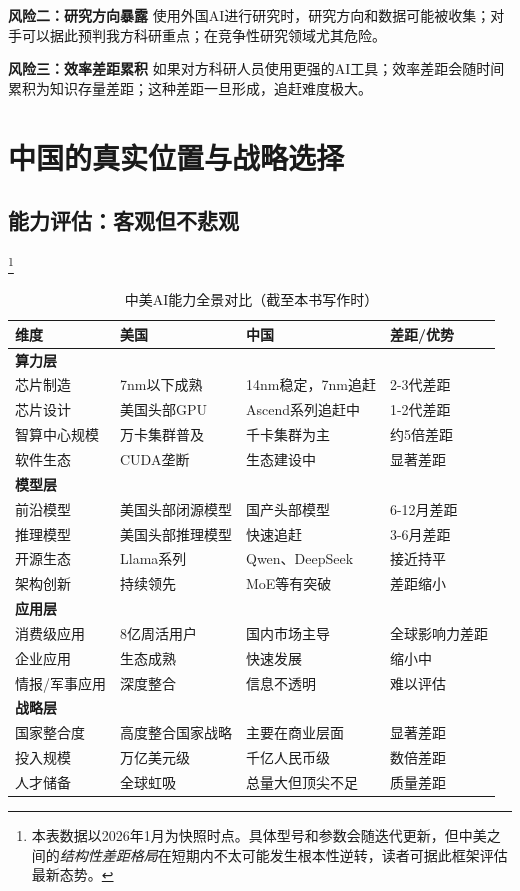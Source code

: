\textbf{风险二：研究方向暴露}
使用外国AI进行研究时，研究方向和数据可能被收集；对手可以据此预判我方科研重点；在竞争性研究领域尤其危险。

\textbf{风险三：效率差距累积}
如果对方科研人员使用更强的AI工具；效率差距会随时间累积为知识存量差距；这种差距一旦形成，追赶难度极大。

\section{中国的真实位置与战略选择}

\subsection{能力评估：客观但不悲观}

\begin{table}[H]
\centering
\caption{中美AI能力全景对比（截至本书写作时）\label{tab:us_china_ai_snapshot}}\footnote{本表数据以2026年1月为快照时点。具体型号和参数会随迭代更新，但中美之间的\emph{结构性差距格局}在短期内不太可能发生根本性逆转，读者可据此框架评估最新态势。}
\small
\begin{tabular}{p{3cm}p{3.5cm}p{3.5cm}p{2.5cm}}
\toprule
{\bfseries 维度} & \textbf{美国} & \textbf{中国} & \textbf{差距/优势} \\
\midrule
\multicolumn{4}{l}{\textbf{算力层}} \\
\midrule
芯片制造 & 7nm以下成熟 & 14nm稳定，7nm追赶 & 2-3代差距 \\
芯片设计 & 美国头部GPU\footnotemark & Ascend系列追赶中 & 1-2代差距 \\
智算中心规模 & 万卡集群普及 & 千卡集群为主 & 约5倍差距 \\
软件生态 & CUDA垄断 & 生态建设中 & 显著差距 \\
\midrule
\multicolumn{4}{l}{\textbf{模型层}} \\
\midrule
前沿模型 & 美国头部闭源模型\footnotemark & 国产头部模型\footnotemark & 6-12月差距 \\
推理模型 & 美国头部推理模型 & 快速追赶 & 3-6月差距 \\
开源生态 & Llama系列 & Qwen、DeepSeek & 接近持平 \\
架构创新 & 持续领先 & MoE等有突破 & 差距缩小 \\
\midrule
\multicolumn{4}{l}{\textbf{应用层}} \\
\midrule
消费级应用 & 8亿周活用户 & 国内市场主导 & 全球影响力差距 \\
企业应用 & 生态成熟 & 快速发展 & 缩小中 \\
情报/军事应用 & 深度整合 & 信息不透明 & 难以评估 \\
\midrule
\multicolumn{4}{l}{\textbf{战略层}} \\
\midrule
国家整合度 & 高度整合国家战略 & 主要在商业层面 & 显著差距 \\
投入规模 & 万亿美元级 & 千亿人民币级 & 数倍差距 \\
人才储备 & 全球虹吸 & 总量大但顶尖不足 & 质量差距 \\
\bottomrule
\end{tabular}
\end{table}
